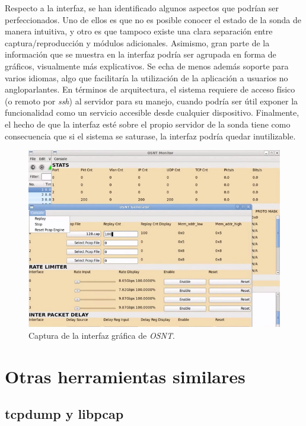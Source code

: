 Respecto a la interfaz, se han identificado algunos aspectos que podrían ser perfeccionados.
Uno de ellos es que no es posible conocer el estado de la sonda de manera intuitiva, y otro es que tampoco existe una clara separación entre captura/reproducción y módulos adicionales.
Asimismo, gran parte de la información que se muestra en la interfaz podría ser agrupada en forma de gráficos, visualmente más explicativos.
Se echa de menos además soporte para varios idiomas, algo que facilitaría la utilización de la aplicación a usuarios no angloparlantes.
En términos de arquitectura, el sistema requiere de acceso físico (o remoto por \textit{ssh}) al servidor para su manejo, cuando podría ser útil exponer la funcionalidad como un servicio accesible desde cualquier dispositivo.
Finalmente, el hecho de que la interfaz esté sobre el propio servidor de la sonda tiene como consecuencia que si el sistema se saturase, la interfaz podría quedar inutilizable.

\begin{figure}[H]
  \centering
  \includegraphics[width=\textwidth,clip=true]{graphics/capturas/osnt}
  \caption{Captura de la interfaz gráfica de \textit{OSNT}.}
  \label{fig:osnt}
\end{figure}

\section{Otras herramientas similares\label{sec:eda:otras}}

\subsection*{tcpdump y libpcap\label{sec:eda:tcpdump}}

